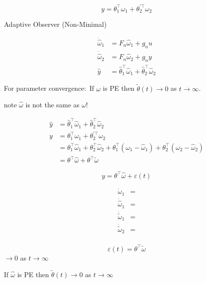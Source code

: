 \begin{equation*}
  y=\theta_{1}^{\top}\omega_{1}+\theta_{2}^{\prime\top}\omega_{2}
\end{equation*}

Adaptive Observer (Non-Minimal)


\begin{align*}
  \dot{\hat{\omega}}_{1}&=F_{n}\hat{\omega}_{1}+g_{n}u \\
  \dot{\hat{\omega}}_{2}&=F_{n}\hat{\omega}_{2}+g_{n}y \\
  \hat{y}&=\hat{\theta}_{1}^{\top}\hat{\omega}_{1}+\hat{\theta}_{2}^{\top}\hat{\omega}_{2}
\end{align*}

For parameter convergence:\  If $\omega$ is PE then $\tilde{\theta}(t)\rightarrow0$ as $t\rightarrow\infty$.

note $\hat{\omega}$ is not the same as $\omega$!

\begin{align*}
  \hat{y}&=\hat{\theta}_{1}^{\top}\hat{\omega}_{1}+\hat{\theta}_{2}^{\top}\hat{\omega}_{2} \\
  y&=\theta_{1}^{\top}\omega_{1}+\theta_{2}^{\prime\top}\omega_{2} \\
  &=\theta_{1}^{\top}\hat{\omega}_{1}+\theta_{2}^{\top}\hat{\omega}_{2}+
  \theta_{1}^{\top}(\omega_{1}-\hat{\omega}_{1})+\theta_{2}^{\top}(\omega_{2}-\hat{\omega}_{2}) \\
  &=\theta^{\top}\hat{\omega}+\theta^{\top}\tilde{\omega}
\end{align*}

\begin{equation*}
  y=\theta^{\top}\hat{\omega}+\varepsilon(t)
\end{equation*}

\begin{align*}
  \dot{\omega}_{1}&= \\
  \dot{\hat{\omega}}_{1}&= \\
  \dot{\tilde{\omega}}_{1}&= \\
  \dot{\tilde{\omega}}_{2}&= \\
\end{align*}

\begin{equation*}
  \varepsilon(t)=\theta^{\top}\tilde{\omega}
\end{equation*}
$\rightarrow0$ as $t\rightarrow\infty$

If $\hat{\omega}$ is PE then $\tilde{\theta}(t)\rightarrow0$ as $t\rightarrow\infty$

